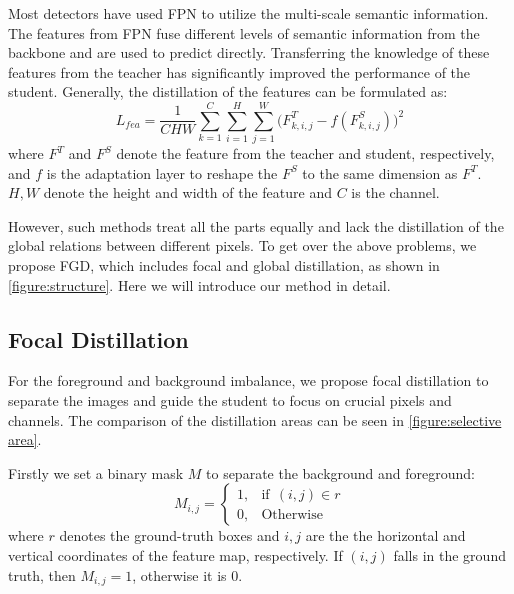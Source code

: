 \documentclass[10pt,twocolumn,letterpaper]{article}
\begin{document}
Most detectors have used FPN\cite{lin2017feature} to utilize the multi-scale semantic information. The features from FPN fuse different levels of semantic information from the backbone and are used to predict directly. Transferring the knowledge of these features from the teacher has significantly improved the performance of the student. Generally, the distillation of the features can be formulated as:
\begin{equation}
    L_{fea}=\frac{1}{CHW}\sum_{k=1}^{C}\sum_{i=1}^{H}\sum_{j=1}^{W}\big( F_{k,i,j}^{T}-f(F_{k,i,j}^{S})\big)^{2}
  \label{general_feature_loss}
\end{equation}
where $F^{T}$ and $F^{S}$ denote the feature from the teacher and student, respectively, and $f$ is the adaptation layer to reshape the $F^{S}$ to the same dimension as $F^{T}$. $H, W$ denote the height and width of the feature and $C$ is the channel.

However, such methods treat all the parts equally and lack the distillation of the global relations between different pixels. To get over the above problems, we propose FGD, which includes focal and global distillation, as shown in \cref{figure:structure}. Here we will introduce our method in detail.

\subsection{Focal Distillation}
\label{sec:focal dis}
For the foreground and background imbalance, we propose focal distillation to separate the images and guide the student to focus on crucial pixels and channels. The comparison of the distillation areas can be seen in \cref{figure:selective area}.

Firstly we set a binary mask $M$ to separate the background and foreground:
\begin{equation}
    \label{mask}
    M_{i,j}=
    \begin{cases}
        1, & \text{if}\ \ (i,j)\in r \\ 
        0, & \text{Otherwise}
    \end{cases}
\end{equation}
where $r$ denotes the ground-truth boxes and $i, j$ are the the horizontal and vertical coordinates of the feature map, respectively. If $(i, j)$ falls in the ground truth, then $M_{i,j} = 1$, otherwise it is 0.
\end{document}
